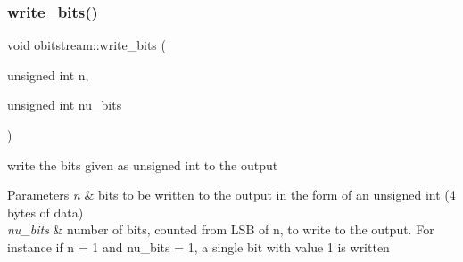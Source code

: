 \subsubsection{\texorpdfstring{write\+\_\+bits()}{write\_bits()}}
{\footnotesize\ttfamily void obitstream\+::write\+\_\+bits (\begin{DoxyParamCaption}\item[{unsigned int}]{n,  }\item[{unsigned int}]{nu\+\_\+bits }\end{DoxyParamCaption})}



write the bits given as unsigned int to the output 


\begin{DoxyParams}{Parameters}
{\em n} & bits to be written to the output in the form of an unsigned int (4 bytes of data) \\
\hline
{\em nu\+\_\+bits} & number of bits, counted from L\+SB of n, to write to the output. For instance if n = 1 and nu\+\_\+bits = 1, a single bit with value 1 is written \\
\hline
\end{DoxyParams}

